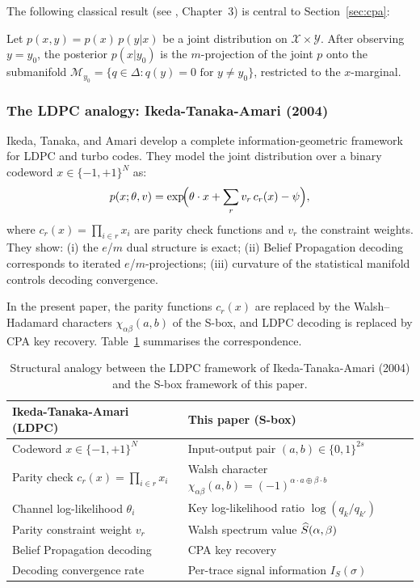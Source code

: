 The following classical result (see \cite{amari2000methods}, Chapter~3)
is central to Section~\ref{sec:cpa}:

\begin{proposition}\label{prop:bayes-m}
Let $p(x,y) = p(x)\,p(y|x)$ be a joint distribution on $\mathcal{X}\times\mathcal{Y}$.
After observing $y=y_0$, the posterior $p(x|y_0)$ is the $m$-projection of
the joint $p$ onto the submanifold
$\mathcal{M}_{y_0} = \{q\in\Delta : q(y)=0 \text{ for } y\neq y_0\}$,
restricted to the $x$-marginal.
\end{proposition}

\subsubsection{The LDPC analogy: Ikeda-Tanaka-Amari (2004)}

Ikeda, Tanaka, and Amari \cite{ikeda2004information} develop a complete
information-geometric framework for LDPC and turbo codes.
They model the joint distribution over a binary codeword $x\in\{-1,+1\}^N$ as:
\begin{equation}\label{eq:ikeda}
  p(x;\theta,v) = \exp\!\Bigl(\theta\cdot x + \sum_r v_r\,c_r(x) - \psi\Bigr),
\end{equation}
where $c_r(x) = \prod_{i\in r} x_i$ are parity check functions and $v_r$ the
constraint weights.
They show: (i) the $e$/$m$ dual structure is exact; (ii) Belief Propagation
decoding corresponds to iterated $e$/$m$-projections; (iii) curvature of the
statistical manifold controls decoding convergence.

In the present paper, the parity functions $c_r(x)$ are replaced by the
Walsh--Hadamard characters $\chi_{\alpha\beta}(a,b)$ of the S-box, and LDPC
decoding is replaced by CPA key recovery.
Table~\ref{tab:analogy} summarises the correspondence.

\begin{table}[htbp]
\centering
\caption{Structural analogy between the LDPC framework of Ikeda-Tanaka-Amari
(2004) and the S-box framework of this paper.}\label{tab:analogy}
\begin{tabular}{@{}ll@{}}
\toprule
Ikeda-Tanaka-Amari (LDPC) & This paper (S-box) \\
\midrule
Codeword $x\in\{-1,+1\}^N$ & Input-output pair $(a,b)\in\{0,1\}^{2s}$ \\
Parity check $c_r(x)=\prod_{i\in r} x_i$ & Walsh character $\chi_{\alpha\beta}(a,b)=(-1)^{\alpha\cdot a\oplus\beta\cdot b}$ \\
Channel log-likelihood $\theta_i$ & Key log-likelihood ratio $\log(q_k/q_{k'})$ \\
Parity constraint weight $v_r$ & Walsh spectrum value $\widehat{S}(\alpha,\beta)$ \\
Belief Propagation decoding & CPA key recovery \\
Decoding convergence rate & Per-trace signal information $I_S(\sigma)$ \\
\bottomrule
\end{tabular}
\end{table}
